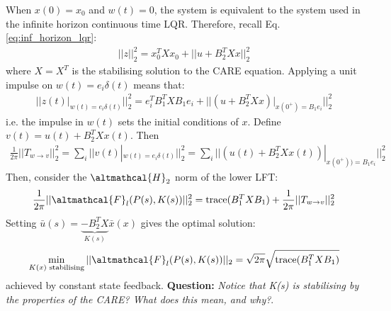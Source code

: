 \documentclass[a4paper]{book}
\newcommand{\question}[1]{{\color{red}\textbf{Question: }\emph{#1}}}
\newcommand{\ix}[1]{%
  \leavevmode %
  \marginpar{\small\emph{#1}}%
}
\begin{document}
When $x(0) = x_0$ and $w(t) = 0$, the system is equivalent to the system used in the infinite horizon continuous time LQR. Therefore, recall Eq. \ref{eq:inf_horizon_lqr}:
\begin{align*}
||z||_2^2 = x_0^T X x_0 + || u + B_2^TXx ||_2^2
\end{align*}
where $X = X^T$ is the stabilising solution to the CARE equation. Applying a unit impulse on $w(t) = e_i \delta(t)$ means that:
\begin{align}
\Big|\Big| z(t)|_{w(t) = e_i \delta(t)}   \Big|\Big|_2^2  = e_i^T B_1^T X B_1 e_i + \Big|\Big| (u + B_2^TXx ) \Big|_{x(0^+) = B_1 e_i}   \Big|\Big|_2^2
\end{align}
i.e. the impulse in $w(t)$ sets the initial conditions of $x$. Define $v(t) = u(t) + B_2^T X x(t)$. Then
\begin{align}
\frac{1}{2\pi} ||T_{w\rightarrow v}||_2^2 = \sum_i \Big|\Big| v(t)|_{w(t) = e_i \delta(t)}   \Big|\Big|_2^2 = \sum_i \Big|\Big| (u(t) + B_2^T X x(t))|_{x(0^+)) = B_1 e_i}   \Big|\Big|_2^2 
\end{align}
Then, consider the $\altmathcal{H}_2$ norm of the lower LFT:
\begin{align}
\frac{1}{2\pi} ||\altmathcal{F}_l(P(s), K(s))||_2^2  = \text{trace}(B_1^{T} X B_1) + \frac{1}{2\pi} || T_{w \rightarrow v} ||_2^2
\end{align}
\ix{Minimiser}Setting $\bar{u}(s) = \underbrace{-B_2^T X}_{K(s)} \bar{x}(x)$ gives the optimal solution:\begin{align}
\min_{K(x)\text{ stabilising}} ||\altmathcal{F}_l(P(s), K(s))||_2 = \sqrt{2\pi } \sqrt{\text{trace}(B_1^{T} X B_1)}
\end{align}
achieved by constant state feedback. \question{Notice that K(s) is stabilising by the properties of the CARE? What does this mean, and why?}. 
\end{document}
